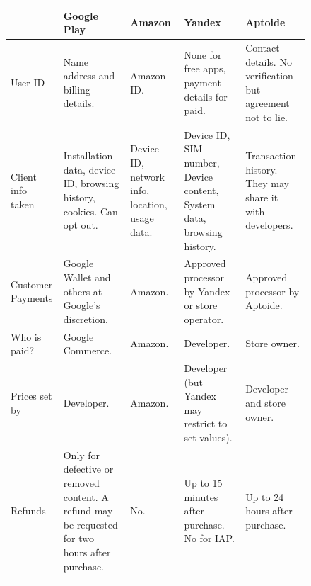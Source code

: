 \documentclass[a4paper]{scrartcl}
\begin{document}
\begin{figure}[!h]\tiny
\begin{tabulary}{\linewidth}{lLLLL}
\toprule
                     & Google Play
                     & Amazon
                     & Yandex
                     & Aptoide \\ \midrule
User ID              & Name address and billing details.
                     & Amazon ID.
                     & None for free apps, payment details for paid.
                     & Contact details. No verification but agreement not to lie.                                                                                                        \\ \addlinespace
Client info taken    & Installation data, device ID, browsing history, cookies. Can opt out.
                     & Device ID, network info, location, usage data.
                     & Device ID, SIM number, Device content, System data, browsing history.
                     & Transaction history.  They may share it with developers.                                                                                                          \\ \addlinespace
Customer Payments    & Google Wallet and others at Google's discretion.
                     & Amazon.
                     & Approved processor by Yandex or store operator.
                     & Approved processor by Aptoide.                                                                                                                                    \\ \addlinespace
Who is paid?         & Google Commerce.
                     & Amazon.
                     & Developer.
                     & Store owner.                                                                                                                                                      \\ \addlinespace
Prices set by        & Developer.
                     & Amazon.
                     & Developer (but Yandex may restrict to set values).
                     & Developer and store owner.                                                                                                                                        \\ \addlinespace
Refunds              & Only for defective or removed content. A refund may be requested for two hours after purchase.
                     & No.
                     & Up to 15 minutes after purchase. No for IAP.
                     & Up to 24 hours after purchase.                                                                                                                                     \\ \addlinespace

\end{tabulary}
\end{figure}
\end{document}
